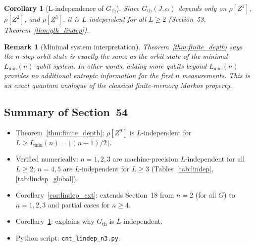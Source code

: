 \documentclass[12pt,a4paper]{article}
\newtheorem{corollary}[theorem]{Corollary}
\newtheorem{remark}[theorem]{Remark}
\begin{document}
\begin{corollary}[L-independence of $G_\mathrm{th}$]\label{cor:gth_lindep2}
Since $G_\mathrm{th}(J,\alpha)$ depends only on $\rho[Z^1]$, $\rho[Z^2]$, and $\rho[Z^3]$,
it is $L$-independent for all $L\geq2$ (Section~53, Theorem~\ref{thm:gth_lindep}).
\end{corollary}

\begin{remark}[Minimal system interpretation]
Theorem~\ref{thm:finite_depth} says the $n$-step orbit state is exactly the same as
the orbit state of the minimal $L_\mathrm{min}(n)$-qubit system.
In other words, adding more qubits beyond $L_\mathrm{min}(n)$ provides no additional
entropic information for the first $n$ measurements.
This is an exact quantum analogue of the classical finite-memory Markov property.
\end{remark}

\subsection*{Summary of Section~54}
\begin{itemize}
\item Theorem~\ref{thm:finite_depth}: $\rho[Z^n]$ is $L$-independent for
  $L\geq L_\mathrm{min}(n)=\lceil(n+1)/2\rceil$.
\item Verified numerically: $n=1,2,3$ are machine-precision $L$-independent for all
  $L\geq2$; $n=4,5$ are $L$-independent for $L\geq3$ (Tables~\ref{tab:lindep}, \ref{tab:lindep_global}).
\item Corollary~\ref{cor:lindep_ext}: extends Section~18 from $n=2$ (for all $G$)
  to $n=1,2,3$ and partial cases for $n\geq4$.
\item Corollary~\ref{cor:gth_lindep2}: explains why $G_\mathrm{th}$ is $L$-independent.
\item Python script: \texttt{cnt\_lindep\_n3.py}.
\end{itemize}
\end{document}

